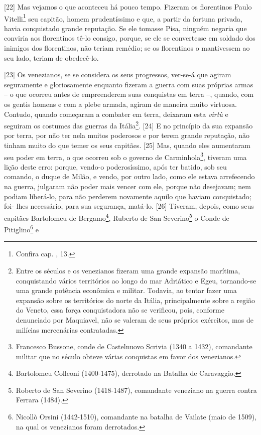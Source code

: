 {[}22{]}
Mas vejamos o que aconteceu há pouco tempo. Fizeram os florentinos Paulo
Vitelli\footnote{Confira cap. , 13.} seu capitão, homem
prudentíssimo e que, a partir da fortuna privada, havia conquistado
grande reputação. Se ele tomasse Pisa, ninguém negaria que conviria aos
florentinos tê-lo consigo, porque, se ele se convertesse em soldado dos
inimigos dos florentinos, não teriam remédio; se os florentinos o
mantivessem ao seu lado, teriam de obedecê-lo.

{[}23{]} Os venezianos, se se considera os seus progressos, ver-se-á que
agiram seguramente e gloriosamente enquanto fizeram a guerra com suas
próprias armas -- o que ocorreu antes de empreenderem suas conquistas em
terra --, quando, com os gentis homens e com a plebe armada, agiram de
maneira muito virtuosa. Contudo, quando começaram a combater em terra,
deixaram esta \emph{virtù} e seguiram os costumes das guerras da
Itália\footnote{Entre os séculos  e  os venezianos fizeram uma
  grande expansão marítima, conquistando vários territórios ao longo do
  mar Adriático e Egeu, tornando-se uma grande potência econômica e
  militar. Todavia, ao tentar fazer uma expansão sobre os territórios do
  norte da Itália, principalmente sobre a região do Veneto, essa força
  conquistadora não se verificou, pois, conforme denunciado por
  Maquiavel, não se valeram de seus próprios exércitos, mas de milícias
  mercenárias contratadas.}. {[}24{]} E no princípio da sua expansão por
terra, por não ter nela muitos poderosos e por terem grande reputação,
não tinham muito do que temer os seus capitães. {[}25{]} Mas, quando
eles aumentaram seu poder em terra, o que ocorreu sob o governo de
Carminhola\footnote{Francesco Bussone, conde de Castelnuovo Scrivia
  (1340 a 1432), comandante militar que no século  obteve várias
  conquistas em favor dos venezianos.}, tiveram uma lição deste erro:
porque, vendo-o poderosíssimo, após ter batido, sob seu comando, o duque
de Milão, e vendo, por outro lado, como ele estava arrefecendo na
guerra, julgaram não poder mais vencer com ele, porque não desejavam;
nem podiam liberá-lo, para não perderem novamente aquilo que haviam
conquistado; foi- lhes necessário, para sua segurança, matá-lo. {[}26{]}
Tiveram, depois, como seus capitães Bartolomeu de Bergamo\footnote{Bartolomeu
  Colleoni (1400-1475), derrotado na Batalha de Caravaggio.}, Ruberto de
San Severino\footnote{Roberto de San Severino (1418-1487), comandante
  veneziano na guerra contra Ferrara (1484).} o Conde de
Pitiglino\footnote{Nicollò Orsini (1442-1510), comandante na batalha de
  Vailate (maio de 1509), na qual os venezianos foram derrotados.} e
